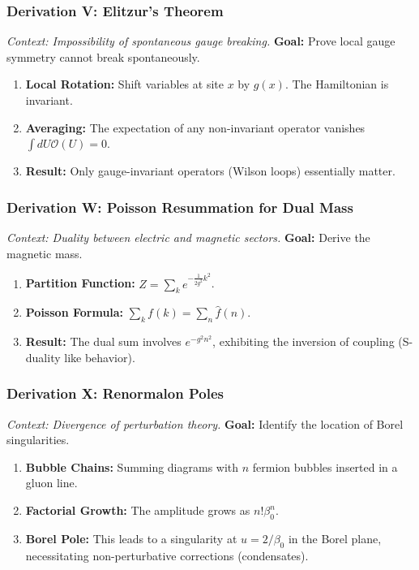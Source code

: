 \subsubsection{Derivation V: Elitzur's Theorem}
\textit{Context: Impossibility of spontaneous gauge breaking.}
\textbf{Goal:} Prove local gauge symmetry cannot break spontaneously.
\begin{enumerate}
    \item \textbf{Local Rotation:} Shift variables at site $x$ by $g(x)$. The Hamiltonian is invariant.
    \item \textbf{Averaging:} The expectation of any non-invariant operator vanishes $\int dU \mathcal{O}(U) = 0$.
    \item \textbf{Result:} Only gauge-invariant operators (Wilson loops) essentially matter.
\end{enumerate}

\subsubsection{Derivation W: Poisson Resummation for Dual Mass}
\textit{Context: Duality between electric and magnetic sectors.}
\textbf{Goal:} Derive the magnetic mass.
\begin{enumerate}
    \item \textbf{Partition Function:} $Z = \sum_k e^{-\frac{1}{2g^2} k^2}$.
    \item \textbf{Poisson Formula:} $\sum_k f(k) = \sum_n \hat{f}(n)$.
    \item \textbf{Result:} The dual sum involves $e^{-g^2 n^2}$, exhibiting the inversion of coupling (S-duality like behavior).
\end{enumerate}

\subsubsection{Derivation X: Renormalon Poles}
\textit{Context: Divergence of perturbation theory.}
\textbf{Goal:} Identify the location of Borel singularities.
\begin{enumerate}
    \item \textbf{Bubble Chains:} Summing diagrams with $n$ fermion bubbles inserted in a gluon line.
    \item \textbf{Factorial Growth:} The amplitude grows as $n! \beta_0^n$.
    \item \textbf{Borel Pole:} This leads to a singularity at $u = 2/\beta_0$ in the Borel plane, necessitating non-perturbative corrections (condensates).
\end{enumerate}

